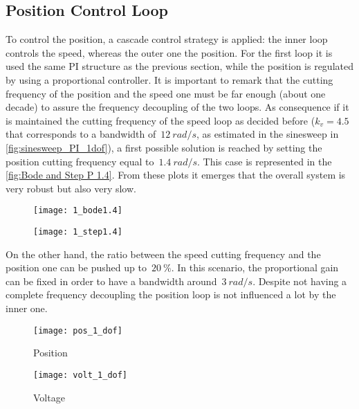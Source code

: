 \subsection{Position Control Loop}
To control the position, a cascade control strategy is applied: the inner loop controls the speed, whereas the outer one the position. For the first loop it is used the same PI structure as the previous section, while the position is regulated by using a proportional controller. It is important to remark that the cutting frequency of the position and the speed one must be far enough (about one decade) to assure the frequency decoupling of the two loops. As consequence if it is maintained the cutting frequency of the speed loop as decided before ($k_v=4.5$ that corresponds to a bandwidth of~$12\ rad/s$, as estimated in the sinesweep in \cref{fig:sinesweep_PI_1dof}), a first possible solution is reached by setting the position cutting frequency equal to~$1.4\ rad/s$. This case is represented in the \cref{fig:Bode and Step P 1.4}. From these plots it emerges that the overall system is very robust but also very slow.

\begin{figure*}[h]
	\centering
	\begin{subfigure}{0.45\columnwidth}
		\texttt{[image: 1\_bode1.4]}
	\end{subfigure}
	\begin{subfigure}{0.45\columnwidth}
		\texttt{[image: 1\_step1.4]}
	\end{subfigure}
	\caption{Position control loop with  $w_{c,p}=1.4\ rad/s$}
	\label{fig:Bode and Step P 1.4}
\end{figure*}

On the other hand, the ratio between the speed cutting frequency and the position one can be pushed up to~$20\ \%$. In this scenario, the proportional gain can be fixed in order to have a bandwidth around~$3\ rad/s$. Despite not having a complete frequency decoupling the position loop is not influenced a lot by the inner one.


\begin{figure*}[h]
	\centering
	\begin{subfigure}{0.45\columnwidth}
		\texttt{[image: pos\_1\_dof]}
		\caption{Position}
	\end{subfigure}
	\begin{subfigure}{0.45\columnwidth}
		\texttt{[image: volt\_1\_dof]}
		\caption{Voltage}
	\end{subfigure}
	\caption{Step response with $k_{p}=3.5$}
	\label{fig:Pos_1dof_3.5}
\end{figure*}

